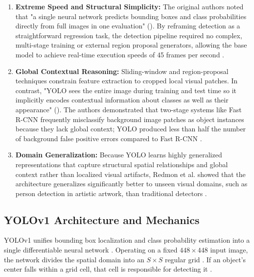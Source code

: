 \begin{enumerate}

    \item \textbf{Extreme Speed and Structural Simplicity:} The original authors noted that "a single neural network predicts bounding boxes and class probabilities directly from full images in one evaluation" (\textcite{redmon_you_2016}). By reframing detection as a straightforward regression task, the detection pipeline required no complex, multi-stage training or external region proposal generators, allowing the base model to achieve real-time execution speeds of 45 frames per second \parencite{ramos_yoloreview, redmon_you_2016}.
    \item \textbf{Global Contextual Reasoning:} Sliding-window and region-proposal techniques constrain feature extraction to cropped local visual patches. In contrast, "YOLO sees the entire image during training and test time so it implicitly encodes contextual information about classes as well as their appearance" (\textcite{redmon_you_2016}). The authors demonstrated that two-stage systems like Fast R-CNN frequently misclassify background image patches as object instances because they lack global context; YOLO produced less than half the number of background false positive errors compared to Fast R-CNN \parencite{ramos_yoloreview, redmon_you_2016}.
    \item \textbf{Domain Generalization:} Because YOLO learns highly generalized representations that capture structural spatial relationships and global context rather than localized visual artifacts, Redmon et al. showed that the architecture generalizes significantly better to unseen visual domains, such as person detection in artistic artwork, than traditional detectors \parencite{ramos_yoloreview, redmon_you_2016}.

\end{enumerate}

\subsection{YOLOv1 Architecture and Mechanics}

YOLOv1 unifies bounding box localization and class probability estimation into a single differentiable neural network \parencite{redmon_you_2016}. Operating on a fixed $448 \times 448$ input image, the network divides the spatial domain into an $S \times S$ regular grid \parencite{redmon_you_2016}. If an object's center falls within a grid cell, that cell is responsible for detecting it \parencite{redmon_you_2016}.

